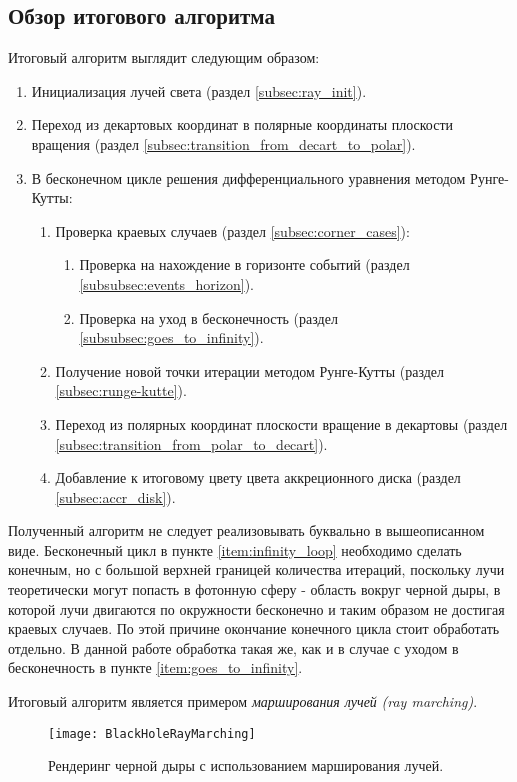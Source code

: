 \subsection{Обзор итогового алгоритма}
\label{subsec:algos}

Итоговый алгоритм выглядит следующим образом:

\begin{enumerate}
\label{enum:algos}
    \item Инициализация лучей света (раздел \ref{subsec:ray_init}).
    \item Переход из декартовых координат в полярные координаты плоскости вращения (раздел \ref{subsec:transition_from_decart_to_polar}).
    \item В бесконечном цикле решения дифференциального уравнения методом Рунге-Кутты:
    \label{item:infinity_loop}
    \begin{enumerate}
        \item Проверка краевых случаев (раздел \ref{subsec:corner_cases}):
        \begin{enumerate}
            \item Проверка на нахождение в горизонте событий (раздел \ref{subsubsec:events_horizon}).
            \item Проверка на уход в бесконечность (раздел \ref{subsubsec:goes_to_infinity}).
            \label{item:goes_to_infinity}
        \end{enumerate}
        \item Получение новой точки итерации методом Рунге-Кутты (раздел \ref{subsec:runge-kutte}).
        \item Переход из полярных координат плоскости вращение в декартовы (раздел \ref{subsec:transition_from_polar_to_decart}).
        \item Добавление к итоговому цвету цвета аккреционного диска (раздел \ref{subsec:accr_disk}).
    \end{enumerate}
\end{enumerate}

Полученный алгоритм не следует реализовывать буквально в вышеописанном виде. Бесконечный цикл в пункте \ref{item:infinity_loop} необходимо сделать конечным, но с большой верхней границей количества итераций, поскольку лучи теоретически могут попасть в фотонную сферу - область вокруг черной дыры, в которой лучи двигаются по окружности бесконечно и таким образом не достигая краевых случаев. По этой причине окончание конечного цикла стоит обработать отдельно. В данной работе обработка такая же, как и в случае с уходом в бесконечность в пункте \ref{item:goes_to_infinity}.

Итоговый алгоритм является примером \textit{марширования лучей} \linebreak\textit{(ray marching)}.

\begin{figure}[h]
    \centering
    \texttt{[image: BlackHoleRayMarching]}
    \caption{Рендеринг черной дыры с использованием марширования лучей.}
    \label{fig:black_hole_ray_marching}
\end{figure}

\newpage
